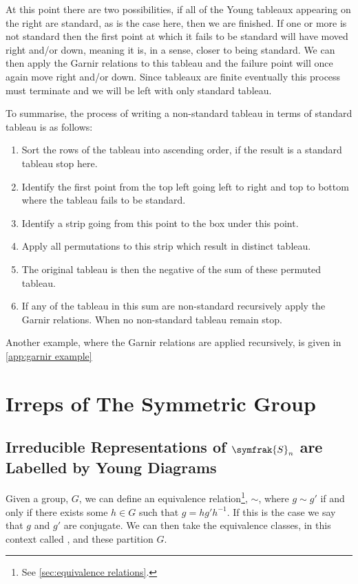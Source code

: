 \documentclass[fleqn]{NotesClass}
\newcommand{\symmetricGroup}[1][n]{\symfrak{S}_{#1}}
\begin{document}
    At this point there are two possibilities, if all of the Young tableaux appearing on the right are standard, as is the case here, then we are finished.
    If one or more is not standard then the first point at which it fails to be standard will have moved right and/or down, meaning it is, in a sense, closer to being standard.
    We can then apply the Garnir relations to this tableau and the failure point will once again move right and/or down.
    Since tableaux are finite eventually this process must terminate and we will be left with only standard tableau.
    
    To summarise, the process of writing a non-standard tableau in terms of standard tableau is as follows:
    \begin{enumerate}
        \item Sort the rows of the tableau into ascending order, if the result is a standard tableau stop here.
        \item Identify the first point from the top left going left to right and top to bottom where the tableau fails to be standard.
        \item Identify a strip going from this point to the box under this point.
        \item Apply all permutations to this strip which result in distinct tableau.
        \item The original tableau is then the negative of the sum of these permuted tableau.
        \item If any of the tableau in this sum are non-standard recursively apply the Garnir relations.
        When no non-standard tableau remain stop.
    \end{enumerate}
    Another example, where the Garnir relations are applied recursively, is given in \cref{app:garnir example}
    
    \chapter{Irreps of The Symmetric Group}
    \section{Irreducible Representations of \texorpdfstring{\(\symmetricGroup\)}{Sn} are Labelled by Young Diagrams}\label{sec:irreps of Sn labelled by Young diagrams}
    Given a group, \(G\), we can define an equivalence relation\footnote{See \cref{sec:equivalence relations}.}, \(\sim\), where \(g \sim g'\) if and only if there exists some \(h \in G\) such that \(g = hg'h^{-1}\).
    If this is the case we say that \(g\) and \(g'\) are conjugate.
    We can then take the equivalence classes, in this context called , and these partition \(G\).
    
\end{document}
